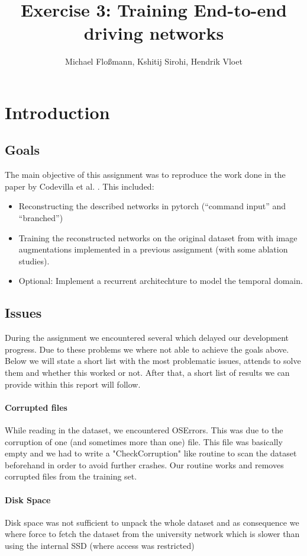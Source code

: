 \documentclass[a4paper]{article}
\title{Exercise 3: Training End-to-end driving networks}
\author{Michael Floßmann, Kshitij Sirohi, Hendrik Vloet}
\begin{document}
\maketitle

\section{Introduction}
\subsection{Goals}
The main objective of this assignment was to reproduce the work done in the
paper by Codevilla et al. \cite{imitation}. This included:
\begin{itemize}
\item Reconstructing the described networks in pytorch (``command input'' and ``branched'')
\item Training the reconstructed networks on the original dataset from
  \cite{imitation} with image augmentations implemented in a previous
  assignment (with some ablation studies).
\item Optional: Implement a recurrent architechture to model the temporal domain.
\end{itemize} 

\subsection{Issues}

During the assignment we encountered several which delayed our development progress. Due to these problems we where not able to achieve the goals above. Below we will state a short list with the most problematic issues, attends to solve them and whether this worked or not. After that, a short list of results we can provide within this report will follow.

	\paragraph{Corrupted files} While reading in the dataset, we encountered OSErrors. This was due to the corruption of one (and sometimes more than one) file. This file was basically empty and we had to write a "CheckCorruption" like routine to scan the dataset beforehand in order to avoid further crashes. Our routine works and removes corrupted files from the training set.
	\paragraph{Disk Space} Disk space was not sufficient to unpack the whole dataset and as consequence we where force to fetch the dataset from the university network which is slower than using the internal SSD (where access was restricted)
\end{document}
